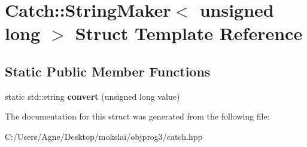 \hypertarget{struct_catch_1_1_string_maker_3_01unsigned_01long_01_4}{}\section{Catch\+:\+:String\+Maker$<$ unsigned long $>$ Struct Template Reference}
\label{struct_catch_1_1_string_maker_3_01unsigned_01long_01_4}
\subsection*{Static Public Member Functions}
\begin{DoxyCompactItemize}
\item 
\mbox{\label{struct_catch_1_1_string_maker_3_01unsigned_01long_01_4_ae105dc97e4462a86a61b59667f8423c9}} 
static std\+::string {\bfseries convert} (unsigned long value)
\end{DoxyCompactItemize}


The documentation for this struct was generated from the following file\+:\begin{DoxyCompactItemize}
\item 
C\+:/\+Users/\+Agne/\+Desktop/mokslai/objprog3/catch.\+hpp\end{DoxyCompactItemize}
